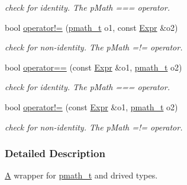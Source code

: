 \begin{CompactItemize}
\begin{CompactList}\small\item\em check for identity. The pMath === operator. \item\end{CompactList}\item 
\hypertarget{classpmath_1_1_expr_5fa33e215bf480edf753c398e811e8b2}{
bool \hyperlink{classpmath_1_1_expr_5fa33e215bf480edf753c398e811e8b2}{operator!=} (\hyperlink{classpmath__t}{pmath\_\-t} o1, const \hyperlink{classpmath_1_1_expr}{Expr} \&o2)}
\label{classpmath_1_1_expr_5fa33e215bf480edf753c398e811e8b2}

\begin{CompactList}\small\item\em check for non-identity. The pMath =!= operator. \item\end{CompactList}\item 
\hypertarget{classpmath_1_1_expr_f5aff278fa31906005ddcc185f7573b1}{
bool \hyperlink{classpmath_1_1_expr_f5aff278fa31906005ddcc185f7573b1}{operator==} (const \hyperlink{classpmath_1_1_expr}{Expr} \&o1, \hyperlink{classpmath__t}{pmath\_\-t} o2)}
\label{classpmath_1_1_expr_f5aff278fa31906005ddcc185f7573b1}

\begin{CompactList}\small\item\em check for identity. The pMath === operator. \item\end{CompactList}\item 
\hypertarget{classpmath_1_1_expr_ce3b12796a848ecc42dfb79700c4e24a}{
bool \hyperlink{classpmath_1_1_expr_ce3b12796a848ecc42dfb79700c4e24a}{operator!=} (const \hyperlink{classpmath_1_1_expr}{Expr} \&o1, \hyperlink{classpmath__t}{pmath\_\-t} o2)}
\label{classpmath_1_1_expr_ce3b12796a848ecc42dfb79700c4e24a}

\begin{CompactList}\small\item\em check for non-identity. The pMath =!= operator. \item\end{CompactList}\end{CompactItemize}


\subsubsection{Detailed Description}
\hyperlink{class_a}{A} wrapper for \hyperlink{classpmath__t}{pmath\_\-t} and drived types.

